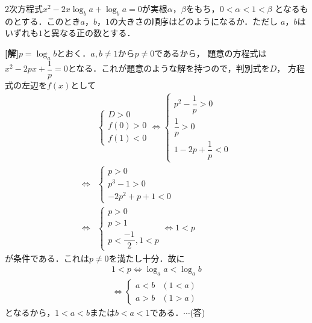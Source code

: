 \documentclass[a4j]{jarticle}
\begin{document}

     \begin{oframed}
     $2$次方程式$x^2-2x\log_ba+\log_ba=0$が実根$\alpha$，$\beta$をもち，$0<\alpha<1<\beta$
     となるものとする．このとき$a$，$b$，$1$の大きさの順序はどのようになるか．ただし
     $a$，$b$はいずれも$1$と異なる正の数とする．
     \end{oframed}

\setlength{\columnseprule}{0.4pt}
\begin{multicols}{2}
{\bf[解]}$p=\log_ab$とおく．$a,b\not=1$から$p\not=0$であるから，
題意の方程式は$x^2-2px+\dfrac{1}{p}=0$となる．これが題意のような解を持つので，判別式を$D$，
方程式の左辺を$f(x)$として
     \begin{align*}
     &\left\{
          \begin{array}{l}
          D>0  \\
          f(0)>0  \\
          f(1)<0  
          \end{array}
     \right. 
     \Longleftrightarrow\left\{
          \begin{array}{l}
          p^2-\dfrac{1}{p}>0  \\
          \dfrac{1}{p}>0  \\
          1-2p+\dfrac{1}{p}<0  
          \end{array}
     \right. \\
     \Longleftrightarrow&\left\{
          \begin{array}{l}
          p>0  \\
          p^3-1>0  \\
          -2p^2+p+1<0  
          \end{array}
     \right. \\
     \Longleftrightarrow&\left\{
          \begin{array}{l}
          p>0  \\
          p>1  \\
          p<\dfrac{-1}{2},1<p  
          \end{array}
     \right. 
     \Longleftrightarrow 1<p
     \end{align*}
が条件である．これは$p\not=0$を満たし十分．故に
     \begin{align*}
     1<p \Longleftrightarrow      \log_aa<\log_ab  \\
     \Longleftrightarrow\left\{
          \begin{array}{ll}
          a<b & (1<a)  \\
          a>b & (1>a)
          \end{array}
     \right.
     \end{align*}
となるから，$1<a<b$または$b<a<1$である．$\cdots$(答)     
\newpage
\end{multicols}
\end{document}
